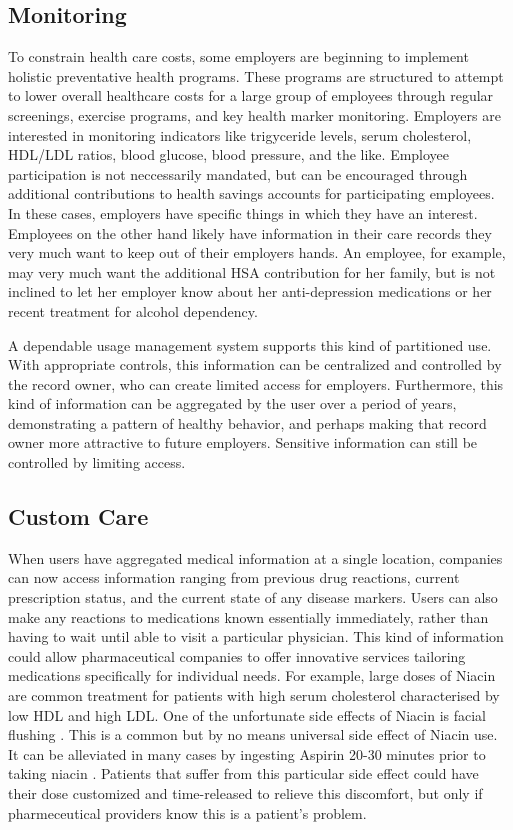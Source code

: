 \documentclass[10pt, conference, compsocconf]{IEEEtran}
\begin{document}
\subsection{Monitoring}
To constrain health care costs, some employers are beginning to implement holistic preventative health programs.  These programs are structured to attempt to lower overall healthcare costs for a large group of employees through regular screenings, exercise programs, and key health marker monitoring.  Employers are interested in monitoring indicators like trigyceride levels, serum cholesterol, HDL/LDL ratios, blood glucose, blood pressure, and the like.  Employee participation is not neccessarily mandated, but can be encouraged through additional contributions to health savings accounts for participating employees.  In these cases, employers have specific things in which they have an interest. Employees on the other hand likely have information in their care records they very much want to keep out of their employers hands.  An employee, for example, may very much want the additional HSA contribution for her family, but is not inclined to let her employer know about her anti-depression medications or her recent treatment for alcohol dependency.

A dependable usage management system supports this kind of partitioned use.  With appropriate controls, this information can be centralized and controlled by the record owner, who can create limited access for employers.  Furthermore, this kind of information can be aggregated by the user over a period of years, demonstrating a pattern of healthy behavior, and perhaps making that record owner more attractive to future employers.  Sensitive information can still be controlled by limiting access.

\subsection{Custom Care}
When users have aggregated medical information at a single location, companies can now access information ranging from previous drug reactions, current prescription status, and the current state of any disease markers.  Users can also make any reactions to medications known essentially immediately, rather than having to wait until able to visit a particular physician.  This kind of information could allow pharmaceutical companies to offer innovative services tailoring medications specifically for individual needs.  For example, large doses of Niacin are common treatment for patients with high serum cholesterol characterised by low HDL and high LDL.  One of the unfortunate side effects of Niacin is facial flushing \cite{Emr:Web:Niacin}.  This is a common but by no means universal side effect of Niacin use.  It can be alleviated in many cases by ingesting Aspirin 20-30 minutes prior to taking niacin \cite{Emr:Web:Niacin}.  Patients that suffer from this particular side effect could have their dose customized and time-released to relieve this discomfort, but only if pharmeceutical providers know this is a patient's problem.
\end{document}

